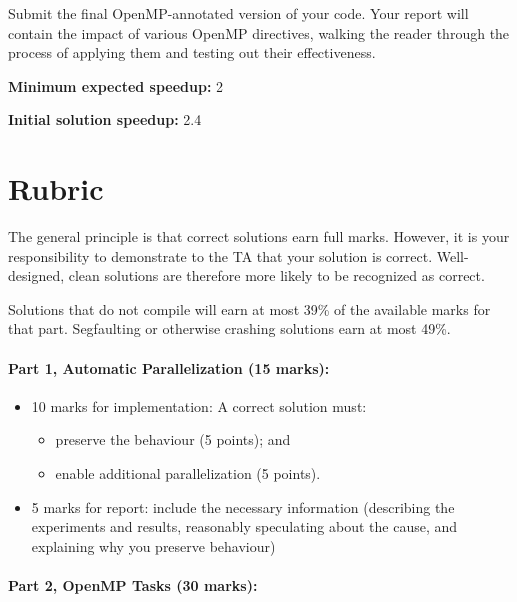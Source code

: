 \documentclass[letterpaper,10pt]{article}
\begin{document}
Submit the final OpenMP-annotated version of your code. Your report will contain the impact of various OpenMP directives, walking the reader through the process of applying them and testing out their effectiveness.

\squishlist
  \item {\bf Minimum expected speedup:} 2
  \item {\bf Initial solution speedup:} 2.4
\squishend

\newpage
\section*{Rubric}

The general principle is that correct solutions earn full marks.
However, it is your responsibility to demonstrate to the TA
that your solution is correct. Well-designed, clean solutions 
are therefore more likely to be recognized as correct. 

Solutions that do not compile will earn at most 39\% of the available
marks for that part. Segfaulting or otherwise crashing solutions earn
at most 49\%.

\paragraph{Part 1, Automatic Parallelization (15 marks):}  
\begin{itemize}
\item 10 marks for implementation: A correct solution must:
\begin{itemize}
	\item preserve the behaviour (5 points); and
	\item enable additional parallelization (5 points).
\end{itemize}
 
\item 5 marks for report: include the necessary information
(describing the experiments and results, reasonably speculating about
the cause, and explaining why you preserve behaviour)
\end{itemize}

\paragraph{Part 2, OpenMP Tasks (30 marks):} 
\end{document}
